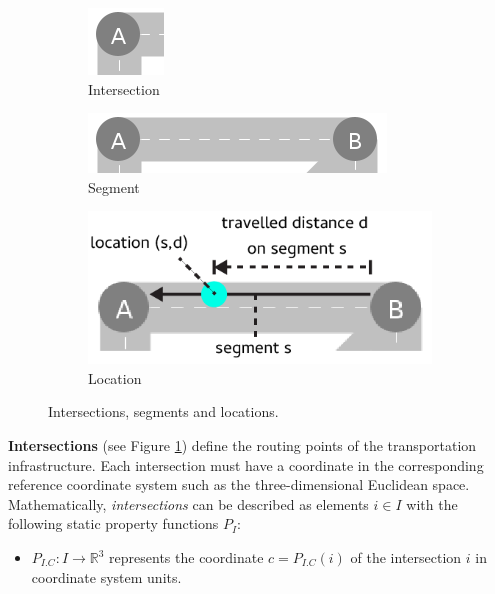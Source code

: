 \documentclass[graybox]{svmult}
\begin{document}
\begin{figure}[htbp]
	\centering
	\begin{subfigure}{.2\textwidth}
		\centering
		\includegraphics[scale=0.4]{./graphics/concepts/intersection.png}
		\caption{Intersection}
		\label{fig:intersection}
	\end{subfigure}
	\begin{subfigure}{.35\textwidth}
		\centering
		\includegraphics[scale=0.4]{./graphics/concepts/segment.png}
		\caption{Segment}
		\label{fig:segment}
	\end{subfigure}
	\begin{subfigure}{.35\textwidth}
		\centering
		\includegraphics[scale=0.4]{./graphics/concepts/location.png}
		\caption{Location}
		\label{fig:location}
	\end{subfigure}
	\caption{Intersections, segments and locations.}
	\label{fig:intersections-segments}	
\end{figure}

\vspace{2mm}

\noindent \textbf{Intersections} (see Figure \ref{fig:intersection}) define the routing points of the transportation infrastructure.
Each intersection must have a coordinate in the corresponding reference coordinate system such as the three-dimensional Euclidean space.
Mathematically, \textit{intersections} can be described as elements $i \in I$ with the following static property functions $P_{I}$:
\begin{itemize}
	\item $P_{I.C}: I \rightarrow \mathbb{R}^3$ represents the coordinate $c = P_{I.C}(i)$ of the intersection $i$ in coordinate system units.
\end{itemize}
\end{document}
